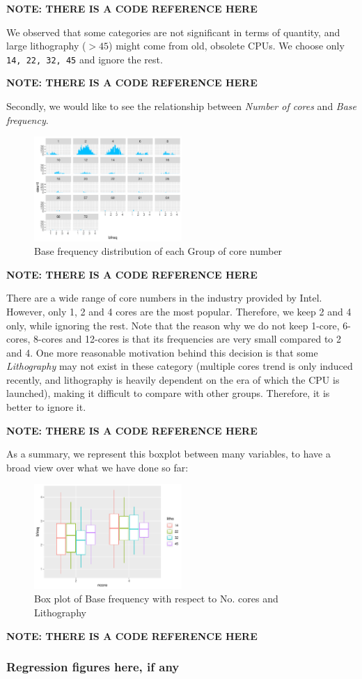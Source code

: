 \textbf{NOTE: THERE IS A CODE REFERENCE HERE}

We observed that some categories are not significant in terms of quantity, and large lithography ($> 45$) might come from old, obsolete CPUs. We choose
only \verb|14, 22, 32, 45| and ignore the rest.

\textbf{NOTE: THERE IS A CODE REFERENCE HERE}

Secondly, we would like to see the relationship between \textit{Number of cores} and \textit{Base frequency}.

\begin{figure}[H]
    \centering
    \includegraphics[width=0.5\textwidth]{./graphics/hist_bfreq_wrt_ncore.pdf}
    \caption{Base frequency distribution of each Group of core number}
    \label{fig:hist_bfreq_wrt_ncore}
\end{figure}

\textbf{NOTE: THERE IS A CODE REFERENCE HERE}

There are a wide range of core numbers in the industry provided by Intel. However, only 1, 2 and 4 cores are the most popular. Therefore, we keep 2 and 4 only,
while ignoring the rest. Note that the reason why we do not keep 1-core, 6-cores, 8-cores and 12-cores is that its frequencies are very small compared to 2 and 4.
One more reasonable motivation behind this decision is that some \textit{Lithography} may not exist in these category (multiple cores trend is only induced recently,
and lithography is heavily dependent on the era of which the CPU is launched), making it difficult to compare with other groups. Therefore, it is better to ignore it.

\textbf{NOTE: THERE IS A CODE REFERENCE HERE}

As a summary, we represent this boxplot between many variables, to have a broad view over what we have done so far:

\begin{figure}[H]
    \centering
    \includegraphics[width=0.5\textwidth]{./graphics/box_bfreq_wrt_ncore_litho.pdf}
    \caption{Box plot of Base frequency with respect to No. cores and Lithography}
    \label{fig:box_bfreq_wrt_ncore_litho}
\end{figure}

\textbf{NOTE: THERE IS A CODE REFERENCE HERE}




\subsubsection{Regression figures here, if any}